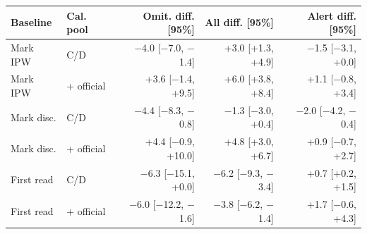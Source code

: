 \begin{tabular}{llrrr}
\toprule
Baseline & Cal. pool & Omit. diff. [95\%] & All diff. [95\%] & Alert diff. [95\%] \\
\midrule
Mark IPW & C/D & $-$4.0 [$-$7.0, $-$1.4] & +3.0 [+1.3, +4.9] & $-$1.5 [$-$3.1, +0.0] \\
Mark IPW & + official & +3.6 [$-$1.4, +9.5] & +6.0 [+3.8, +8.4] & +1.1 [$-$0.8, +3.4] \\
Mark disc. & C/D & $-$4.4 [$-$8.3, $-$0.8] & $-$1.3 [$-$3.0, +0.4] & $-$2.0 [$-$4.2, $-$0.4] \\
Mark disc. & + official & +4.4 [$-$0.9, +10.0] & +4.8 [+3.0, +6.7] & +0.9 [$-$0.7, +2.7] \\
First read & C/D & $-$6.3 [$-$15.1, +0.0] & $-$6.2 [$-$9.3, $-$3.4] & +0.7 [+0.2, +1.5] \\
First read & + official & $-$6.0 [$-$12.2, $-$1.6] & $-$3.8 [$-$6.2, $-$1.4] & +1.7 [$-$0.6, +4.3] \\
\bottomrule
\end{tabular}
